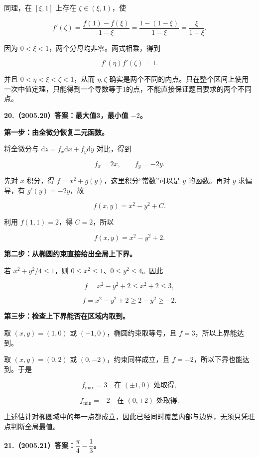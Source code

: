 \documentclass[UTF8,11pt,fontset=windows]{ctexart}
\begin{document}
同理，在 $[\xi,1]$ 上存在 $\zeta\in(\xi,1)$，使

$$
f'(\zeta)=\frac{f(1)-f(\xi)}{1-\xi}
=\frac{1-(1-\xi)}{1-\xi}
=\frac\xi{1-\xi}.
$$

因为 $0<\xi<1$，两个分母均非零。两式相乘，得到

$$
\boxed{f'(\eta)f'(\zeta)=1.}
$$

并且 $0<\eta<\xi<\zeta<1$，从而 $\eta,\zeta$ 确实是两个不同的内点。只在整个区间上使用一次中值定理，只能得到一个导数等于1的点，不能直接保证题目要求的两个不同点。

\clearpage

\textbf{20.（2005.20）答案：最大值3，最小值 $-2$。}

\textbf{第一步：由全微分恢复二元函数。}

将全微分与 $\mathrm dz=f_x\mathrm dx+f_y\mathrm dy$ 对比，得到

$$
f_x=2x,\qquad f_y=-2y.
$$

先对 $x$ 积分，得 $f=x^2+g(y)$，这里积分“常数”可以是 $y$ 的函数。再对 $y$ 求偏导，有 $g'(y)=-2y$，故

$$
f(x,y)=x^2-y^2+C.
$$

利用 $f(1,1)=2$，得 $C=2$，所以

$$
\boxed{f(x,y)=x^2-y^2+2.}
$$

\textbf{第二步：从椭圆约束直接给出全局上下界。}

若 $x^2+y^2/4\le1$，则 $0\le x^2\le1$、$0\le y^2\le4$。因此

$$
f=x^2-y^2+2\le x^2+2\le3,
$$

$$
f=x^2-y^2+2\ge2-y^2\ge-2.
$$

\textbf{第三步：检查上下界能否在区域内取到。}

取 $(x,y)=(1,0)$ 或 $(-1,0)$，椭圆约束取等号，且 $f=3$，所以上界能达到。

取 $(x,y)=(0,2)$ 或 $(0,-2)$，约束同样成立，且 $f=-2$，所以下界也能达到。于是

$$
\boxed{f_{\max}=3\quad\text{在 }(\pm1,0)\text{ 处取得},}
$$

$$
\boxed{f_{\min}=-2\quad\text{在 }(0,\pm2)\text{ 处取得}.}
$$

上述估计对椭圆域中的每一点都成立，因此已经同时覆盖内部与边界，无须只凭驻点判断全局最值。

\clearpage

\textbf{21.（2005.21）答案：$\dfrac\pi4-\dfrac13$。}
\end{document}

